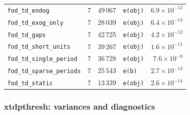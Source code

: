 \begin{longtable}{@{}p{3.6cm}rrp{4.9cm}r@{}}
\texttt{fod\_\allowbreak{}td\_\allowbreak{}endog} & 7 & 49\,067 & \texttt{e(obj)} & $6.9\times10^{-12}$ \\
\texttt{fod\_\allowbreak{}td\_\allowbreak{}exog\_\allowbreak{}only} & 7 & 28\,039 & \texttt{e(obj)} & $6.4\times10^{-13}$ \\
\texttt{fod\_\allowbreak{}td\_\allowbreak{}gaps} & 7 & 42\,725 & \texttt{e(obj)} & $4.2\times10^{-12}$ \\
\texttt{fod\_\allowbreak{}td\_\allowbreak{}short\_\allowbreak{}units} & 7 & 39\,267 & \texttt{e(obj)} & $1.6\times10^{-11}$ \\
\texttt{fod\_\allowbreak{}td\_\allowbreak{}single\_\allowbreak{}period} & 7 & 36\,728 & \texttt{e(obj)} & $7.6\times10^{-9}$ \\
\texttt{fod\_\allowbreak{}td\_\allowbreak{}sparse\_\allowbreak{}periods} & 7 & 25\,543 & \texttt{e(b)} & $2.7\times10^{-13}$ \\
\texttt{fod\_\allowbreak{}td\_\allowbreak{}static} & 7 & 13\,339 & \texttt{e(obj)} & $2.6\times10^{-14}$ \\
\bottomrule
\end{longtable}

\subsubsection*{xtdpthresh: variances and diagnostics}


